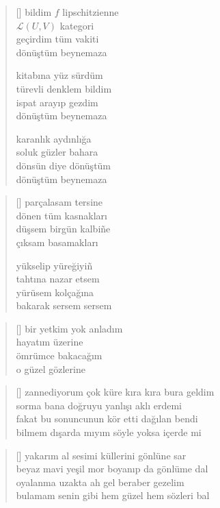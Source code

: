 \documentclass[a5paper, openright, twoside]{memoir}
\begin{document}
\begin{verse}[\versewidth]
  bildim $f$ lipschitzienne \\
  $\mathcal{L}(U, V)$ kategori \\
  geçirdim tüm vakiti \\
  dönüştüm beynemaza

  kitabına yüz sürdüm \\
  türevli denklem bildim \\
  ispat arayıp gezdim \\
  dönüştüm beynemaza

  karanlık aydınlığa \\
  soluk güzler bahara \\
  dönsün diye dönüştüm \\
  dönüştüm beynemaza
\end{verse}
\begin{verse}[\versewidth]
  parçalasam tersine \\
  dönen tüm kasnakları \\
  düşsem birgün kalbi\~ne \\
  çıksam basamakları

  yükselip yüreğiyi\~n \\
  tahtına nazar etsem \\
  yürüsem kolçağına \\
  bakarak sersem sersem
\end{verse}
\begin{verse}[\versewidth]
  bir yetkim yok anladım \\
  hayatım üzerine \\
  ömrümce bakacağım \\
  o güzel gözlerine
\end{verse}
\begin{verse}[\versewidth]
  zannediyorum çok küre kıra kıra bura geldim \\
  sorma bana doğruyu yanlışı aklı erdemi \\
  fakat bu sonuncunun kör etti dağılan bendi \\
  bilmem dışarda mıyım söyle yoksa içerde mi
\end{verse}
\begin{verse}[\versewidth]
  yakarım al sesimi küllerini gönlüne sar \\
  beyaz mavi yeşil mor boyanıp da gönlüme dal \\
  oyalanma uzakta ah gel beraber gezelim \\
  bulamam senin gibi hem güzel hem sözleri bal
\end{verse}
\end{document}
